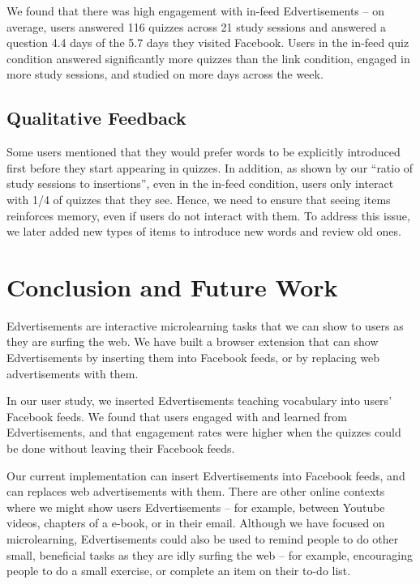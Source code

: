 \documentclass{sigchi}
\begin{document}
We found that there was high engagement with in-feed Edvertisements -- on average, users answered 116 quizzes across 21 study sessions and answered a question 4.4 days of the 5.7 days they visited Facebook. Users in the in-feed quiz condition answered significantly more quizzes than the link condition, engaged in more study sessions, and studied on more days across the week. %

\subsection{Qualitative Feedback}

Some users mentioned that they would prefer words to be explicitly introduced first before they start appearing in quizzes.  In addition, as shown by our ``ratio of study sessions to insertions'', even in the in-feed condition, users only interact with 1/4 of quizzes that they see. Hence, we need to ensure that seeing items reinforces memory, even if users do not interact with them. To address this issue, we later added new types of items to introduce new words and review old ones.

\section{Conclusion and Future Work}

Edvertisements are interactive microlearning tasks that we can show to users as they are surfing the web. We have built a browser extension that can show Edvertisements by inserting them into Facebook feeds, or by replacing web advertisements with them.

In our user study, we inserted Edvertisements teaching vocabulary into users' Facebook feeds. We found that users engaged with and learned from Edvertisements, and that engagement rates were higher when the quizzes could be done without leaving their Facebook feeds.

Our current implementation can insert Edvertisements into Facebook feeds, and can replaces web advertisements with them. There are other online contexts where we might show users Edvertisements -- for example, between Youtube videos, chapters of a e-book, or in their email. Although we have focused on microlearning, Edvertisements could also be used to remind people to do other small, beneficial tasks as they are idly surfing the web -- for example, encouraging people to  do a small exercise, or complete an item on their to-do list. %
\end{document}
